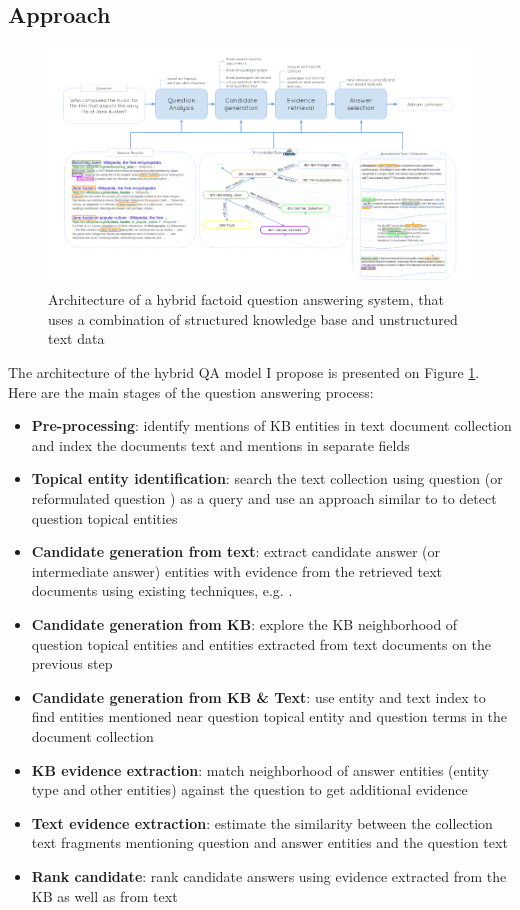 \subsection{Approach}
\label{subsec:text+kb_approach}

\begin{figure}
\centering
\includegraphics[width=\textwidth]{img/text_and_kb}
\caption{Architecture of a hybrid factoid question answering system, that uses a combination of structured knowledge base and unstructured text data}
\label{fig:text_kb}
\end{figure}

The architecture of the hybrid QA model I propose is presented on Figure \ref{fig:text_kb}.
Here are the main stages of the question answering process:
\begin{itemize}
\setlength\itemsep{0em}
\item \textbf{Pre-processing}: identify mentions of KB entities in text document collection and index the documents text and mentions in separate fields
\item \textbf{Topical entity identification}: search the text collection using question (or reformulated question \cite{AgichteinLG01}) as a query and use an approach similar to \cite{cornolti2014smaph} to detect question topical entities
\item \textbf{Candidate generation from text}: extract candidate answer (or intermediate answer) entities with evidence from the retrieved text documents using existing techniques, e.g. \cite{tsai2015web}.
\item \textbf{Candidate generation from KB}: explore the KB neighborhood of question topical entities and entities extracted from text documents on the previous step
\item \textbf{Candidate generation from KB \& Text}: use entity and text index to find entities mentioned near question topical entity and question terms in the document collection
\item \textbf{KB evidence extraction}: match neighborhood of answer entities (entity type and other entities) against the question to get additional evidence
\item \textbf{Text evidence extraction}: estimate the similarity between the collection text fragments mentioning question and answer entities and the question text
\item \textbf{Rank candidate}: rank candidate answers using evidence extracted from the KB as well as from text
\end{itemize}

